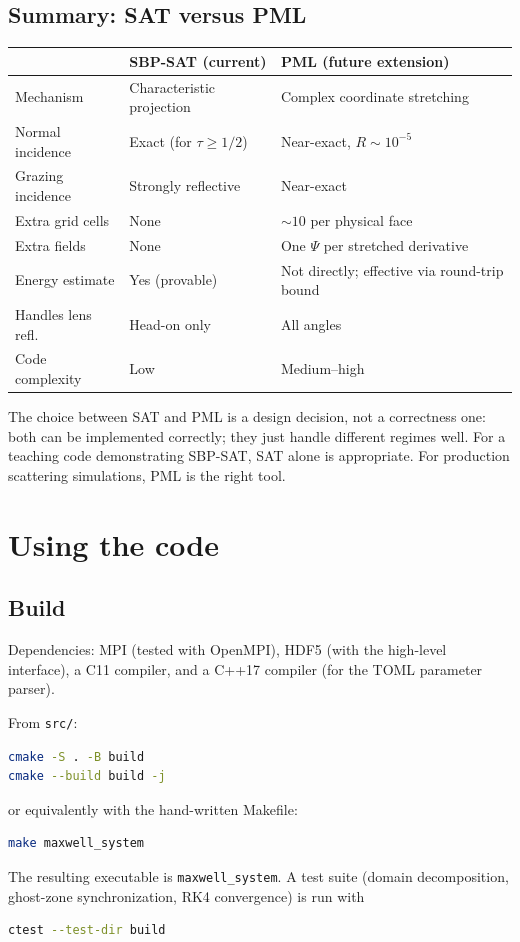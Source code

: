 \documentclass[11pt]{article}
\begin{document}
\subsection{Summary: SAT versus PML}

\begin{center}
\begin{tabular}{lll}
\toprule
 & SBP-SAT (current) & PML (future extension) \\
\midrule
Mechanism          & Characteristic projection & Complex coordinate stretching \\
Normal incidence   & Exact (for $\tau \geq 1/2$) & Near-exact, $R \sim 10^{-5}$ \\
Grazing incidence  & Strongly reflective        & Near-exact \\
Extra grid cells   & None                       & $\sim 10$ per physical face \\
Extra fields       & None                       & One $\Psi$ per stretched derivative \\
Energy estimate    & Yes (provable)             & Not directly; effective via round-trip bound \\
Handles lens refl. & Head-on only               & All angles \\
Code complexity    & Low                        & Medium--high \\
\bottomrule
\end{tabular}
\end{center}

The choice between SAT and PML is a design decision, not a
correctness one: both can be implemented correctly; they just
handle different regimes well. For a teaching code demonstrating
SBP-SAT, SAT alone is appropriate. For production scattering
simulations, PML is the right tool.

\section{Using the code}
\label{sec:using}

\subsection{Build}

Dependencies: MPI (tested with OpenMPI), HDF5 (with the high-level
interface), a C11 compiler, and a C++17 compiler (for the TOML
parameter parser).

From \texttt{src/}:
\begin{lstlisting}[language=bash]
cmake -S . -B build
cmake --build build -j
\end{lstlisting}
or equivalently with the hand-written Makefile:
\begin{lstlisting}[language=bash]
make maxwell_system
\end{lstlisting}
The resulting executable is \texttt{maxwell\_system}. A test suite
(domain decomposition, ghost-zone synchronization, RK4 convergence) is
run with
\begin{lstlisting}[language=bash]
ctest --test-dir build
\end{lstlisting}
\end{document}
